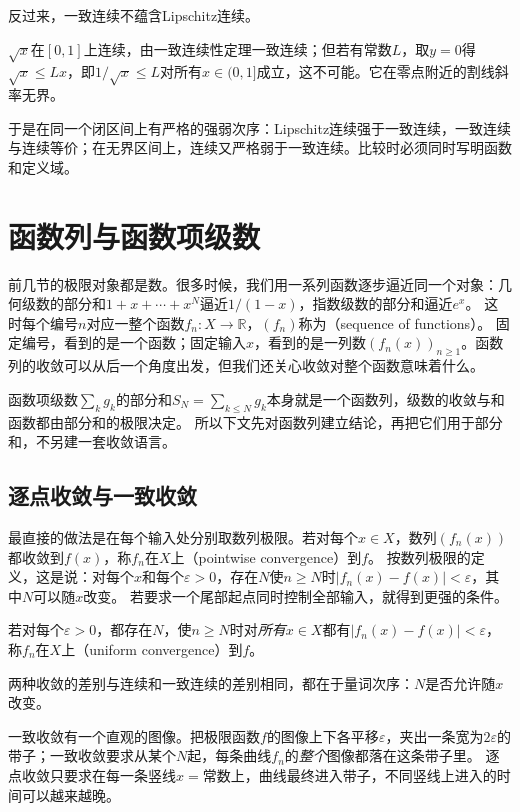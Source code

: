 反过来，一致连续不蕴含Lipschitz连续。
\begin{example}[一致连续而非Lipschitz连续]
\label{ex:ru-sqrt-not-lipschitz}
$\sqrt x$在$[0,1]$上连续，由一致连续性定理一致连续；但若有常数$L$，取$y=0$得$\sqrt x\leq Lx$，即$1/\sqrt x\leq L$对所有$x\in(0,1]$成立，这不可能。它在零点附近的割线斜率无界。
\end{example}

于是在同一个闭区间上有严格的强弱次序：Lipschitz连续强于一致连续，一致连续与连续等价；在无界区间上，连续又严格弱于一致连续。比较时必须同时写明函数和定义域。
\section{函数列与函数项级数}
\label{sec:ru-function-sequences}

前几节的极限对象都是数。很多时候，我们用一系列函数逐步逼近同一个对象：几何级数的部分和$1+x+\cdots+x^N$逼近$1/(1-x)$，指数级数的部分和逼近$e^x$。
这时每个编号$n$对应一整个函数$f_n:X\to\mathbb R$，$(f_n)$称为（sequence of functions）。
固定编号，看到的是一个函数；固定输入$x$，看到的是一列数$(f_n(x))_{n\geq1}$。函数列的收敛可以从后一个角度出发，但我们还关心收敛对整个函数意味着什么。

函数项级数$\sum_kg_k$的部分和$S_N=\sum_{k\leq N}g_k$本身就是一个函数列，级数的收敛与和函数都由部分和的极限决定。
所以下文先对函数列建立结论，再把它们用于部分和，不另建一套收敛语言。

\subsection{逐点收敛与一致收敛}
\label{sec:ru-pointwise-uniform}

最直接的做法是在每个输入处分别取数列极限。若对每个$x\in X$，数列$(f_n(x))$都收敛到$f(x)$，称$f_n$在$X$上（pointwise convergence）到$f$。
按数列极限的定义，这是说：对每个$x$和每个$\varepsilon>0$，存在$N$使$n\geq N$时$|f_n(x)-f(x)|<\varepsilon$，其中$N$可以随$x$改变。
若要求一个尾部起点同时控制全部输入，就得到更强的条件。
\begin{definition}[一致收敛]
\label{def:ru-uniform-convergence}
若对每个$\varepsilon>0$，都存在$N$，使$n\geq N$时对\emph{所有}$x\in X$都有$|f_n(x)-f(x)|<\varepsilon$，称$f_n$在$X$上（uniform convergence）到$f$。
\end{definition}
两种收敛的差别与连续和一致连续的差别相同，都在于量词次序：$N$是否允许随$x$改变。

一致收敛有一个直观的图像。把极限函数$f$的图像上下各平移$\varepsilon$，夹出一条宽为$2\varepsilon$的带子；一致收敛要求从某个$N$起，每条曲线$f_n$的\emph{整个}图像都落在这条带子里。
逐点收敛只要求在每一条竖线$x=\text{常数}$上，曲线最终进入带子，不同竖线上进入的时间可以越来越晚。

